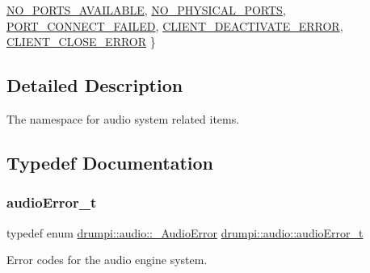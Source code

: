 \begin{DoxyCompactItemize}
\newline
\hyperlink{namespacedrumpi_1_1audio_af36111ce9632c39e5acb2c811f228e2fa4d00d14583b30f88c890a22754f0d42b}{N\+O\+\_\+\+P\+O\+R\+T\+S\+\_\+\+A\+V\+A\+I\+L\+A\+B\+LE}, 
\hyperlink{namespacedrumpi_1_1audio_af36111ce9632c39e5acb2c811f228e2fa7948a95fdb3b37ab61a3a08d997faa1c}{N\+O\+\_\+\+P\+H\+Y\+S\+I\+C\+A\+L\+\_\+\+P\+O\+R\+TS}, 
\hyperlink{namespacedrumpi_1_1audio_af36111ce9632c39e5acb2c811f228e2fa6a165910fffae742e18607e973d6d9f9}{P\+O\+R\+T\+\_\+\+C\+O\+N\+N\+E\+C\+T\+\_\+\+F\+A\+I\+L\+ED}, 
\hyperlink{namespacedrumpi_1_1audio_af36111ce9632c39e5acb2c811f228e2fa6a3f96b4c397d009a5379e7308eba213}{C\+L\+I\+E\+N\+T\+\_\+\+D\+E\+A\+C\+T\+I\+V\+A\+T\+E\+\_\+\+E\+R\+R\+OR}, 
\newline
\hyperlink{namespacedrumpi_1_1audio_af36111ce9632c39e5acb2c811f228e2fa7e719a21972684efdb06dd52342b82c3}{C\+L\+I\+E\+N\+T\+\_\+\+C\+L\+O\+S\+E\+\_\+\+E\+R\+R\+OR}
 \}
\end{DoxyCompactItemize}


\subsection{Detailed Description}
The namespace for audio system related items. 

\subsection{Typedef Documentation}
\mbox{\label{namespacedrumpi_1_1audio_ac19e3be3b59052606a02605a7ee26f05}} 
\subsubsection{\texorpdfstring{audio\+Error\+\_\+t}{audioError\_t}}
{\footnotesize\ttfamily typedef enum \hyperlink{namespacedrumpi_1_1audio_af36111ce9632c39e5acb2c811f228e2f}{drumpi\+::audio\+::\+\_\+\+Audio\+Error}  \hyperlink{namespacedrumpi_1_1audio_ac19e3be3b59052606a02605a7ee26f05}{drumpi\+::audio\+::audio\+Error\+\_\+t}}

Error codes for the audio engine system. \mbox{\label{namespacedrumpi_1_1audio_aca0bdc9164f87b72057e284442abab6e}} 
